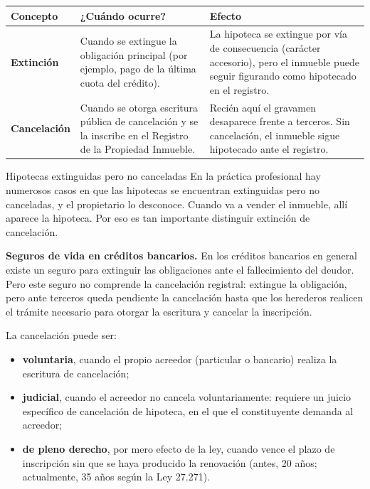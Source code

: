 \documentclass[12pt,oneside]{book}
\begin{document}
\begin{table}[H]
\centering
\begin{tabularx}{\textwidth}{@{}>{\raggedright\arraybackslash}p{}>{\raggedright\arraybackslash}p{}>{\raggedright\arraybackslash}X@{}}
\toprule
\textbf{Concepto} & \textbf{¿Cuándo ocurre?} & \textbf{Efecto} \\
\midrule
\textbf{Extinción} & Cuando se extingue la obligación principal (por ejemplo, pago de la última cuota del crédito). & La hipoteca se extingue por vía de consecuencia (carácter accesorio), pero el inmueble puede seguir figurando como hipotecado en el registro. \\
\textbf{Cancelación} & Cuando se otorga escritura pública de cancelación y se la inscribe en el Registro de la Propiedad Inmueble. & Recién aquí el gravamen desaparece frente a terceros. Sin cancelación, el inmueble sigue hipotecado ante el registro. \\
\bottomrule
\end{tabularx}
\end{table}

\begin{example}{Hipotecas extinguidas pero no canceladas}
En la práctica profesional hay numerosos casos en que las hipotecas se encuentran extinguidas pero no canceladas, y el propietario lo desconoce. Cuando va a vender el inmueble, allí aparece la hipoteca. Por eso es tan importante distinguir extinción de cancelación.
\end{example}

\begin{note}
\textbf{Seguros de vida en créditos bancarios.} En los créditos bancarios en general existe un seguro para extinguir las obligaciones ante el fallecimiento del deudor. Pero este seguro no comprende la cancelación registral: extingue la obligación, pero ante terceros queda pendiente la cancelación hasta que los herederos realicen el trámite necesario para otorgar la escritura y cancelar la inscripción.
\end{note}

La cancelación puede ser:
\begin{itemize}
    \item \textbf{voluntaria}, cuando el propio acreedor (particular o bancario) realiza la escritura de cancelación;
    \item \textbf{judicial}, cuando el acreedor no cancela voluntariamente: requiere un juicio específico de cancelación de hipoteca, en el que el constituyente demanda al acreedor;
    \item \textbf{de pleno derecho}, por mero efecto de la ley, cuando vence el plazo de inscripción sin que se haya producido la renovación (antes, 20 años; actualmente, 35 años según la Ley 27.271).
\end{itemize}
\end{document}
